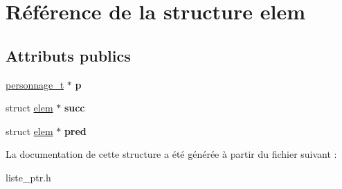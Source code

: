 \hypertarget{structelem}{}\section{Référence de la structure elem}
\label{structelem}
\subsection*{Attributs publics}
\begin{DoxyCompactItemize}
\item 
\mbox{\label{structelem_a2b5fc098e5c542b339e12394a4b2c617}} 
\mbox{\hyperlink{structpersonnage__s}{personnage\+\_\+t}} $\ast$ {\bfseries p}
\item 
\mbox{\label{structelem_a5ff1b9cc747d100bbe420f0e0cd88ec2}} 
struct \mbox{\hyperlink{structelem}{elem}} $\ast$ {\bfseries succ}
\item 
\mbox{\label{structelem_abb040e9d86e108c9bede84a513513bb6}} 
struct \mbox{\hyperlink{structelem}{elem}} $\ast$ {\bfseries pred}
\end{DoxyCompactItemize}


La documentation de cette structure a été générée à partir du fichier suivant \+:\begin{DoxyCompactItemize}
\item 
liste\+\_\+ptr.\+h\end{DoxyCompactItemize}
